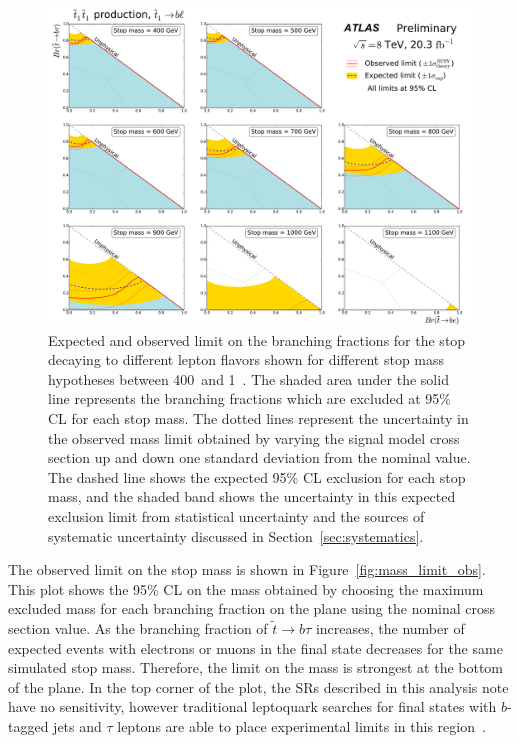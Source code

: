 \begin{figure}[p]
  \centering
  \includegraphics[width=\textwidth]{figs/blstop/limit_contours.pdf}
  \caption{Expected and observed limit on the branching fractions for the stop
    decaying to different lepton flavors shown for different stop mass
    hypotheses between 400~\GeV and 1~\TeV. The shaded area under the solid
    line represents the branching fractions which are excluded at 95\% CL
    for each stop mass.
    The dotted lines represent the uncertainty in the observed mass limit
    obtained by varying the signal model cross section up and down one standard
    deviation from the nominal value. The dashed line shows the
    expected 95\% CL exclusion for each stop mass, and the shaded band shows
    the uncertainty in this expected exclusion limit from statistical
    uncertainty and the sources of systematic uncertainty discussed in
    Section~\ref{sec:systematics}.
  }
  \label{fig:limit_contours}
\end{figure}

The observed limit on the stop mass is shown in Figure~\ref{fig:mass_limit_obs}.
This plot shows the 95\% CL on the mass obtained by choosing
the maximum excluded mass for each branching fraction on the plane using the
nominal cross section value.  
As the branching fraction of $\tilde{t} \rightarrow b\tau$ increases, the number of
expected events with electrons or muons in the final state decreases for the
same simulated stop mass.
Therefore, the limit on the mass is strongest at the bottom of the plane.
In the top corner of the plot, the SRs described in this analysis note have no
sensitivity, however traditional leptoquark searches for final states with
$b$-tagged jets and $\tau$ leptons are able to place experimental limits in this
region~\cite{ATLAS:2013oea}.

